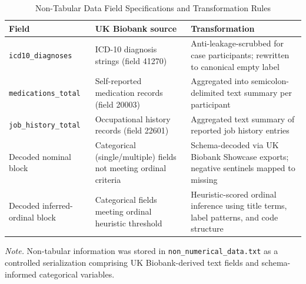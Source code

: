 \documentclass[11pt,a4paper,twoside]{article}
\begin{document}
\begin{table}[H]
\caption{Non-Tabular Data Field Specifications and Transformation Rules}
\label{tab:s5}
\footnotesize
\begin{tabularx}{\linewidth}{l X X}
\toprule
Field & UK Biobank source & Transformation \\
\midrule
\texttt{icd10\_diagnoses} & ICD-10 diagnosis strings (field 41270) & Anti-leakage-scrubbed for case participants; rewritten to canonical empty label \\
\texttt{medications\_total} & Self-reported medication records (field 20003) & Aggregated into semicolon-delimited text summary per participant \\
\texttt{job\_history\_total} & Occupational history records (field 22601) & Aggregated text summary of reported job history entries \\
Decoded nominal block & Categorical (single/multiple) fields not meeting ordinal criteria & Schema-decoded via UK Biobank Showcase exports; negative sentinels mapped to missing \\
Decoded inferred-ordinal block & Categorical fields meeting ordinal heuristic threshold & Heuristic-scored ordinal inference using title terms, label patterns, and code structure \\
\bottomrule
\end{tabularx}
\par\smallskip\noindent\small\textit{Note.} Non-tabular information was stored in \texttt{non\_numerical\_data.txt} as a controlled serialization comprising UK Biobank-derived text fields and schema-informed categorical variables.
\end{table}
\end{document}
